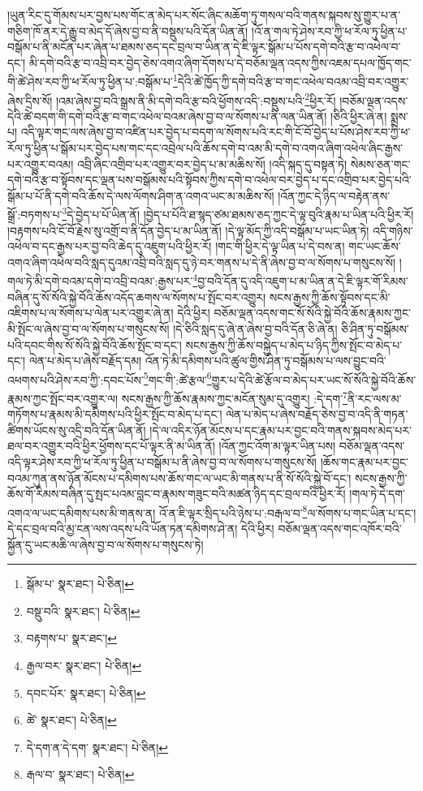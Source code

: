 །ཡུན་རིང་དུ་གོམས་པར་བྱས་པས་གོང་ན་མེད་པར་སོང་ཞིང་མཆོག་ཏུ་གསལ་བའི་གནས་སྐབས་སུ་གྱུར་པ་ན་གཅིག་ཁོ་ནར་དེ་རྒྱུ་བ་མེད་དོ་ཞེས་བྱ་བ་ནི་བསྡུས་པའི་དོན་ཡིན་ནོ། །འོ་ན་གལ་ཏེ་ཤེས་རབ་ཀྱི་ཕ་རོལ་ཏུ་ཕྱིན་པ་བསྒོམ་པ་ནི་མངོན་པར་ཞེན་པ་ཐམས་ཅད་དང་བྲལ་བ་ཡིན་ན་དེ་ཇི་ལྟར་སྒོམ་པ་པོས་དགེ་བའི་རྩ་བ་འཕེལ་བ་དང་། མི་དགེ་བའི་རྩ་བ་འབྲི་བར་བྱེད་ཅེས་འགའ་ཞིག་དོགས་པ་དེ་བཅོམ་ལྡན་འདས་ཀྱིས་འཇམ་དཔལ་ཁྱོད་གང་གི་ཚེ་ཤེས་རབ་ཀྱི་ཕ་རོལ་ཏུ་ཕྱིན་པ་:བསྒོམ་པ་\footnote{སྒོམ་པ་  སྣར་ཐང་།  པེ་ཅིན། }དེའི་ཚེ་ཁྱོད་ཀྱི་དགེ་བའི་རྩ་བ་གང་འཕེལ་བའམ་འབྲི་བར་འགྱུར་ཞེས་དྲིས་སོ། །འམ་ཞེས་བྱ་བའི་སྒྲས་ནི་མི་དགེ་བའི་རྩ་བའི་ཕྱོགས་འདི་:བསྡུས་པའི་\footnote{བསྡུ་བའི་  སྣར་ཐང་།  པེ་ཅིན། }ཕྱིར་རོ། །བཅོམ་ལྡན་འདས་དེའི་ཚེ་བདག་གི་དགེ་བའི་རྩ་བ་གང་འཕེལ་བའམ་ཞེས་བྱ་བ་ལ་སོགས་པ་ནི་ལན་ཡིན་ནོ། །ཅིའི་ཕྱིར་ཞེ་ན། སྨྲས་པ། འདི་ལྟར་གང་ལས་ཞེས་བྱ་བ་འཛིན་པར་བྱེད་པ་བདག་ལ་སོགས་པའི་རང་གི་ངོ་བོ་བྱེད་པ་པོས་ཤེས་རབ་ཀྱི་ཕ་རོལ་ཏུ་ཕྱིན་པ་སྒོམ་པར་བྱེད་པས་གང་དང་འབྲེལ་པའི་ཆོས་དགེ་བ་འམ་མི་དགེ་བ་འགའ་ཞིག་འཕེལ་ཞིང་རྒྱས་པར་འགྱུར་བའམ། འབྲི་ཞིང་འགྲིབ་པར་འགྱུར་བར་བྱེད་པ་མ་མཆིས་སོ། །འདི་སྐད་དུ་བསྟན་ཏེ། སེམས་ཅན་གང་དགེ་བའི་རྩ་བ་སྟོབས་དང་ལྡན་པས་བསྒོམས་པའི་སྟོབས་ཀྱིས་དགེ་བ་འཕེལ་བར་བྱེད་པ་དང་འགྲིབ་པར་བྱེད་པའི་སྒོམ་པ་པོ་ནི་དགེ་བའི་ཆོས་དེ་ལས་ལོགས་ཤིག་ན་འགའ་ཡང་མ་མཆིས་སོ། །འོན་ཀྱང་དེ་ཉིད་ལ་བརྟེན་ནས་སྒྲོ་:བཏགས་པ་\footnote{བརྟགས་པ་  སྣར་ཐང་། }དེ་བྱེད་པ་པོ་ཡིན་ནོ། །བྱེད་པ་པོའི་ཐ་སྙད་ཙམ་ཐམས་ཅད་ཀྱང་དེ་ལྟ་བུའི་རྣམ་པ་ཡིན་པའི་ཕྱིར་རོ། །བརྟགས་པའི་ངོ་བོ་རྗེས་སུ་འགྲོ་བ་ནི་དོན་བྱེད་པ་མ་ཡིན་ནོ། །དེ་ལྟ་མོད་ཀྱི་འདི་བསྒོམ་པ་ཡང་ཡིན་ཏེ། འདི་གཉིས་འཕེལ་བ་དང་རྒྱས་པར་བྱ་བའི་ཆེད་དུ་འཇུག་པའི་ཕྱིར་རོ། །གང་གི་ཕྱིར་དེ་ལྟ་ཡིན་པ་དེ་བས་ན། གང་ཡང་ཆོས་འགའ་ཞིག་འཕེལ་བའི་སླད་དུའམ་འབྲི་བའི་སླད་དུ་ཉེ་བར་གནས་པ་དེ་ནི་ཞེས་བྱ་བ་ལ་སོགས་པ་གསུངས་སོ། །གལ་ཏེ་མི་དགེ་བའམ་དགེ་བ་འབྲི་བའམ་:རྒྱས་པར་\footnote{རྒྱལ་བར་  སྣར་ཐང་།  པེ་ཅིན། }བྱ་བའི་དོན་དུ་འདི་འཇུག་པ་མ་ཡིན་ན་དེ་ཇི་ལྟར་གོ་རིམས་བཞིན་དུ་སོ་སོའི་སྐྱེ་བོའི་ཆོས་འདོད་ཆགས་ལ་སོགས་པ་སྤོང་བར་འགྱུར། སངས་རྒྱས་ཀྱི་ཆོས་སྟོབས་དང་མི་འཇིགས་པ་ལ་སོགས་པ་ལེན་པར་འགྱུར་ཞེ་ན། དེའི་ཕྱིར། བཅོམ་ལྡན་འདས་གང་སོ་སོའི་སྐྱེ་བོའི་ཆོས་རྣམས་ཀྱང་མི་སྤོང་ལ་ཞེས་བྱ་བ་ལ་སོགས་པ་གསུངས་སོ། །དེ་ཅིའི་སླད་དུ་ཞེ་ན་ཞེས་བྱ་བའི་དོན་ཅི་ཞེ་ན། ཅི་ཤིན་ཏུ་བསྒོམས་པའི་དབང་གིས་སོ་སོའི་སྐྱེ་བོའི་ཆོས་སྤོང་བ་དང་། སངས་རྒྱས་ཀྱི་ཆོས་བསྐྱེད་པ་མེད་པ་ཉིད་ཀྱིས་སྤོང་བ་མེད་པ་དང་། ལེན་པ་མེད་པ་ཞེས་བརྗོད་དམ། འོན་ཏེ་མི་དམིགས་པའི་ཚུལ་གྱིས་ཤིན་ཏུ་བསྒོམས་པ་ལས་བྱུང་བའི་འཕགས་པའི་ཤེས་རབ་ཀྱི་:དབང་པོས་\footnote{དབང་པོར་  སྣར་ཐང་།  པེ་ཅིན། }གང་གི་:ཚེ་རྩལ་\footnote{ཚེ་  སྣར་ཐང་།  པེ་ཅིན། }གྱུར་པ་དེའི་ཚེ་རྩོལ་བ་མེད་པར་ཡང་སོ་སོའི་སྐྱེ་བོའི་ཆོས་རྣམས་ཀྱང་སྤོང་བར་འགྱུར་ལ། སངས་རྒྱས་ཀྱི་ཆོས་རྣམས་ཀྱང་མངོན་སུམ་དུ་འགྱུར། :དེ་དག་\footnote{དེ་དག་ན་དེ་དག་  སྣར་ཐང་།  པེ་ཅིན། }ནི་རང་ལས་མ་གཏོགས་པ་རྣམས་མི་དམིགས་པའི་ཕྱིར་སྤོང་བ་མེད་པ་དང་། ལེན་པ་མེད་པ་ཞེས་བརྗོད་ཅེས་བྱ་བ་འདི་ནི་གཏན་ཚིགས་ཡོངས་སུ་འདྲི་བའི་དོན་ཡིན་ནོ། །དེ་ལ་འདིར་ཉོན་མོངས་པ་དང་རྣམ་པར་བྱང་བའི་གནས་སྐབས་མེད་པར་ཐལ་བར་འགྱུར་བའི་ཕྱིར་ཕྱོགས་དང་པོ་ལྟར་ནི་མ་ཡིན་ནོ། །འོན་ཀྱང་འོག་མ་ལྟར་ཡིན་པས། བཅོམ་ལྡན་འདས་འདི་ལྟར་ཤེས་རབ་ཀྱི་ཕ་རོལ་ཏུ་ཕྱིན་པ་བསྒོམ་པ་ནི་ཞེས་བྱ་བ་ལ་སོགས་པ་གསུངས་སོ། །ཆོས་གང་རྣམ་པར་བྱང་བའམ་ཀུན་ནས་ཉོན་མོངས་པ་དམིགས་པས་ཆོས་གང་ལ་ཡང་མི་གནས་པ་ནི་སོ་སོའི་སྐྱེ་བོ་དང་། སངས་རྒྱས་ཀྱི་ཆོས་གོ་རིམས་བཞིན་དུ་སྤང་པའམ་བླང་བ་རྣམས་གཟུང་བའི་མཚན་ཉིད་དང་བྲལ་བའི་ཕྱིར་རོ། །གལ་ཏེ་དེ་དག་འགའ་ལ་ཡང་དམིགས་པས་མི་གནས་ན། འོ་ན་ཇི་ལྟར་སྲིད་པའི་ཉེས་པ་:བརྒལ་བ་\footnote{རྒལ་བ་  སྣར་ཐང་།  པེ་ཅིན། }ལ་སོགས་པ་གང་ཡིན་པ་དང་། དེ་དང་བྲལ་བའི་མྱ་ངན་ལས་འདས་པའི་ཡོན་ཏན་དམིགས་ཤེ་ན། དེའི་ཕྱིར། བཅོམ་ལྡན་འདས་གང་འཁོར་བའི་སྐྱོན་དུ་ཡང་མཆི་ལ་ཞེས་བྱ་བ་ལ་སོགས་པ་གསུངས་ཏེ། 